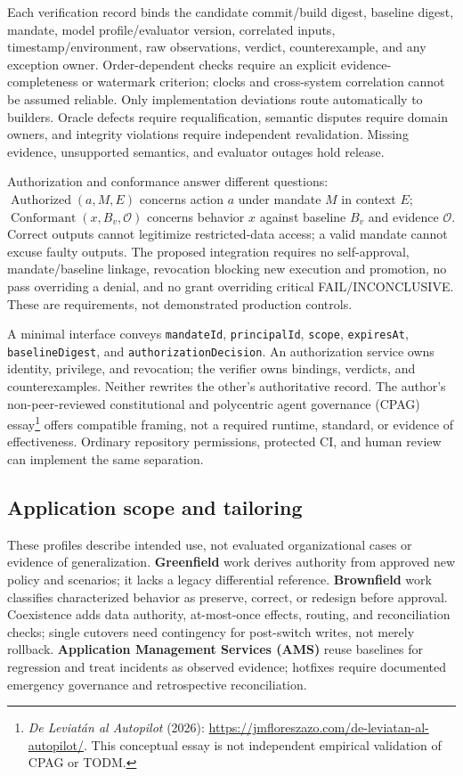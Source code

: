 \documentclass[11pt,a4paper]{article}
\newcommand{\FAIL}{\textsf{FAIL}}
\newcommand{\INC}{\textsf{INCONCLUSIVE}}
\begin{document}
Each verification record binds the candidate commit/build digest, baseline digest, mandate, model profile/evaluator version, correlated inputs, timestamp/environment, raw observations, verdict, counterexample, and any exception owner. Order-dependent checks require an explicit evidence-completeness or watermark criterion; clocks and cross-system correlation cannot be assumed reliable. Only implementation deviations route automatically to builders. Oracle defects require requalification, semantic disputes require domain owners, and integrity violations require independent revalidation. Missing evidence, unsupported semantics, and evaluator outages hold release.

Authorization and conformance answer different questions: $\operatorname{Authorized}(a,M,E)$ concerns action $a$ under mandate $M$ in context $E$; $\operatorname{Conformant}(x,B_v,\mathcal{O})$ concerns behavior $x$ against baseline $B_v$ and evidence $\mathcal{O}$. Correct outputs cannot legitimize restricted-data access; a valid mandate cannot excuse faulty outputs. The proposed integration requires no self-approval, mandate/baseline linkage, revocation blocking new execution and promotion, no pass overriding a denial, and no grant overriding critical \FAIL{}/\INC{}. These are requirements, not demonstrated production controls.

A minimal interface conveys \texttt{mandateId}, \texttt{principalId}, \texttt{scope}, \texttt{expiresAt}, \texttt{baselineDigest}, and \texttt{authorizationDecision}. An authorization service owns identity, privilege, and revocation; the verifier owns bindings, verdicts, and counterexamples. Neither rewrites the other's authoritative record. The author's non-peer-reviewed constitutional and polycentric agent governance (CPAG) essay\footnote{\emph{De Leviat\'an al Autopilot} (2026): \url{https://jmfloreszazo.com/de-leviatan-al-autopilot/}. This conceptual essay is not independent empirical validation of CPAG or TODM.} offers compatible framing, not a required runtime, standard, or evidence of effectiveness. Ordinary repository permissions, protected CI, and human review can implement the same separation.

\subsection{Application scope and tailoring}
These profiles describe intended use, not evaluated organizational cases or evidence of generalization. \textbf{Greenfield} work derives authority from approved new policy and scenarios; it lacks a legacy differential reference. \textbf{Brownfield} work classifies characterized behavior as preserve, correct, or redesign before approval. Coexistence adds data authority, at-most-once effects, routing, and reconciliation checks; single cutovers need contingency for post-switch writes, not merely rollback. \textbf{Application Management Services (AMS)} reuse baselines for regression and treat incidents as observed evidence; hotfixes require documented emergency governance and retrospective reconciliation.
\end{document}
